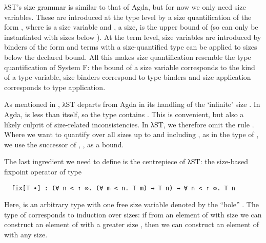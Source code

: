 λST's size grammar is similar to that of Agda, but for now we only need size
variables. These are introduced at the type level by a size quantification of
the form , where  is a size variable and , a
size, is the upper bound of  (so  can only be instantiated
with sizes below ). At the term level, size variables are introduced by
binders of the form  and terms with a size-quantified type can be
applied to sizes below the declared bound. All this makes size quantification
resemble the type quantification of System F: the bound of a size variable
corresponds to the kind of a type variable, size binders correspond to type
binders and size application corresponds to type application.

As mentioned in , λST departs from Agda in its handling
of the \enquote*{infinite} size . In Agda,  is less than
itself, so the type  contains . This is convenient, but
also a likely culprit of size-related inconsistencies. In λST, we therefore omit
the rule . Where we want to quantify over all sizes up to and
including , as in the type of , we use the successor of
, , as a bound.

The last ingredient we need to define  is the centrepiece of λST:
the size-based fixpoint operator  of type
\begin{verbatim}
  fix[T ∙] : (∀ n < ↑ ∞. (∀ m < n. T m) → T n) → ∀ n < ↑ ∞. T n
\end{verbatim}
Here,  is an arbitrary type with one free size variable denoted by the
\enquote{hole} . The type of  corresponds to induction over
sizes: if from an element of  with size  we can construct an
element of  with a greater size , then we can construct an
element of  with any size.

